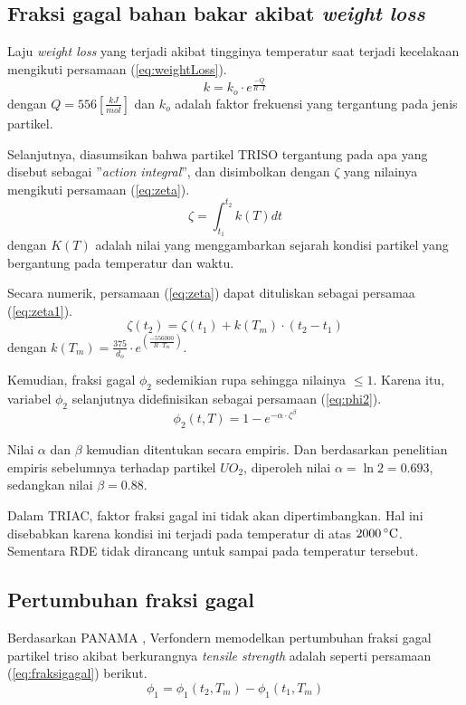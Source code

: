 \documentclass[a4paper,11pt]{report}
\begin{document}
\subsection{Fraksi gagal bahan bakar akibat \textit{weight loss}}
Laju \textit{weight loss} yang terjadi akibat tingginya temperatur saat terjadi kecelakaan mengikuti persamaan (\ref{eq:weightLoss}).
\begin{equation}
  k=k_o \cdot e^{\frac{-Q}{R \cdot T}}
  \label{eq:weightLoss}
\end{equation}
dengan $Q=556 \left[ \frac{kJ}{mol}\right]$ dan $k_o$ adalah faktor frekuensi yang tergantung pada jenis partikel.

Selanjutnya, diasumsikan bahwa partikel TRISO tergantung pada apa yang disebut sebagai ''\textit{action integral}'', dan disimbolkan dengan $\zeta$ yang nilainya mengikuti persamaan (\ref{eq:zeta}).
\begin{equation}
  \zeta=\int_{t_1}^{t_2} k(T) dt
  \label{eq:zeta}
\end{equation}
dengan $K(T)$ adalah nilai yang menggambarkan sejarah kondisi partikel yang bergantung pada temperatur dan waktu.

Secara numerik, persamaan (\ref{eq:zeta}) dapat dituliskan sebagai persamaa (\ref{eq:zeta1}).
\begin{equation}
  \zeta(t_2)=\zeta(t_1)+k(T_m) \cdot (t_2 - t_1)
  \label{eq:zeta1}
\end{equation}
dengan $k(T_m)=\frac{375}{d_o} \cdot e^{\left(\frac{-556000}{R \cdot T_m}\right)}$.

Kemudian, fraksi gagal $\phi_2$ sedemikian rupa sehingga nilainya $\leq 1$. Karena itu, variabel $\phi_2$ selanjutnya didefinisikan sebagai persamaan (\ref{eq:phi2}).
\begin{equation}
\phi_2(t,T)=1-e^{-\alpha \cdot \zeta^{\beta}}
\label{eq:phi2}
\end{equation}

Nilai $\alpha$ dan $\beta$ kemudian ditentukan secara empiris. Dan berdasarkan penelitian empiris sebelumnya terhadap partikel $UO_2$, diperoleh nilai $\alpha=\ln 2=0.693$, sedangkan nilai $\beta=0.88$.

Dalam TRIAC, faktor fraksi gagal ini tidak akan dipertimbangkan. Hal ini disebabkan karena kondisi ini terjadi pada temperatur di atas $2000\,^{\circ}{\rm C}$. Sementara RDE tidak dirancang untuk sampai pada temperatur tersebut.

\subsection{Pertumbuhan fraksi gagal}
Berdasarkan PANAMA \cite{report1}, Verfondern memodelkan pertumbuhan fraksi gagal partikel triso akibat berkurangnya \textit{tensile strength} adalah seperti persamaan (\ref{eq:fraksigagal}) berikut.
\begin{equation}
\phi_1=\phi_1(t_2,T_m)-\phi_1(t_1,T_m)
\label{eq:fraksigagal}
\end{equation}
\end{document}
